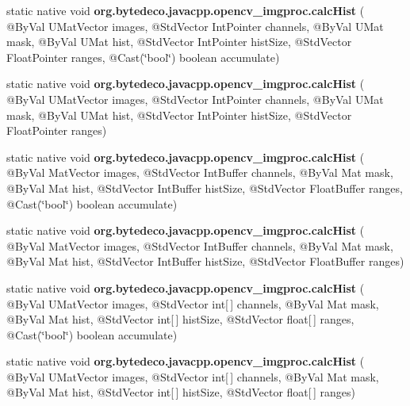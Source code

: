 \begin{DoxyCompactItemize}
static native void {\bfseries org.\+bytedeco.\+javacpp.\+opencv\+\_\+imgproc.\+calc\+Hist} ( @By\+Val U\+Mat\+Vector images, @Std\+Vector Int\+Pointer channels, @By\+Val U\+Mat mask, @By\+Val U\+Mat hist, @Std\+Vector Int\+Pointer hist\+Size, @Std\+Vector Float\+Pointer ranges, @Cast(\char`\"{}bool\char`\"{}) boolean accumulate)
\item 
\mbox{\label{group__imgproc__hist_ga71e9fc1f57aba73cfeffa1b9252f7991}} 
static native void {\bfseries org.\+bytedeco.\+javacpp.\+opencv\+\_\+imgproc.\+calc\+Hist} ( @By\+Val U\+Mat\+Vector images, @Std\+Vector Int\+Pointer channels, @By\+Val U\+Mat mask, @By\+Val U\+Mat hist, @Std\+Vector Int\+Pointer hist\+Size, @Std\+Vector Float\+Pointer ranges)
\item 
\mbox{\label{group__imgproc__hist_ga8b239626280ed867adb3866003af2b8e}} 
static native void {\bfseries org.\+bytedeco.\+javacpp.\+opencv\+\_\+imgproc.\+calc\+Hist} ( @By\+Val Mat\+Vector images, @Std\+Vector Int\+Buffer channels, @By\+Val Mat mask, @By\+Val Mat hist, @Std\+Vector Int\+Buffer hist\+Size, @Std\+Vector Float\+Buffer ranges, @Cast(\char`\"{}bool\char`\"{}) boolean accumulate)
\item 
\mbox{\label{group__imgproc__hist_ga5145eca9f49c32b0ef49e1962d3baded}} 
static native void {\bfseries org.\+bytedeco.\+javacpp.\+opencv\+\_\+imgproc.\+calc\+Hist} ( @By\+Val Mat\+Vector images, @Std\+Vector Int\+Buffer channels, @By\+Val Mat mask, @By\+Val Mat hist, @Std\+Vector Int\+Buffer hist\+Size, @Std\+Vector Float\+Buffer ranges)
\item 
\mbox{\label{group__imgproc__hist_ga4b1312c7bd2bab7e123d64871c51a976}} 
static native void {\bfseries org.\+bytedeco.\+javacpp.\+opencv\+\_\+imgproc.\+calc\+Hist} ( @By\+Val U\+Mat\+Vector images, @Std\+Vector int\mbox{[}$\,$\mbox{]} channels, @By\+Val Mat mask, @By\+Val Mat hist, @Std\+Vector int\mbox{[}$\,$\mbox{]} hist\+Size, @Std\+Vector float\mbox{[}$\,$\mbox{]} ranges, @Cast(\char`\"{}bool\char`\"{}) boolean accumulate)
\item 
\mbox{\label{group__imgproc__hist_gaee48c08d8765147974dadfa0065ea472}} 
static native void {\bfseries org.\+bytedeco.\+javacpp.\+opencv\+\_\+imgproc.\+calc\+Hist} ( @By\+Val U\+Mat\+Vector images, @Std\+Vector int\mbox{[}$\,$\mbox{]} channels, @By\+Val Mat mask, @By\+Val Mat hist, @Std\+Vector int\mbox{[}$\,$\mbox{]} hist\+Size, @Std\+Vector float\mbox{[}$\,$\mbox{]} ranges)

\end{DoxyCompactItemize}
